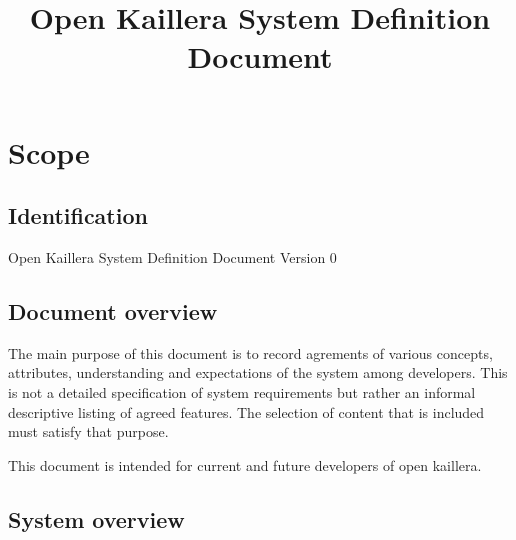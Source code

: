 \documentclass{article}
\begin{document}
\title{Open Kaillera System Definition Document}

\maketitle

\cleardoublepage

\tableofcontents


\cleardoublepage

\section{Scope}

\subsection{Identification}
Open Kaillera System Definition Document Version 0




\subsection{Document overview}

The main purpose of this document is to record agrements of various
 concepts, attributes, understanding and expectations of the system among
 developers. This is not a detailed specification of system requirements but
 rather an informal descriptive listing of agreed features. The selection of
 content that is included must satisfy that purpose.

This document is intended for current and future developers of open kaillera.


\subsection{System overview}
\end{document}
